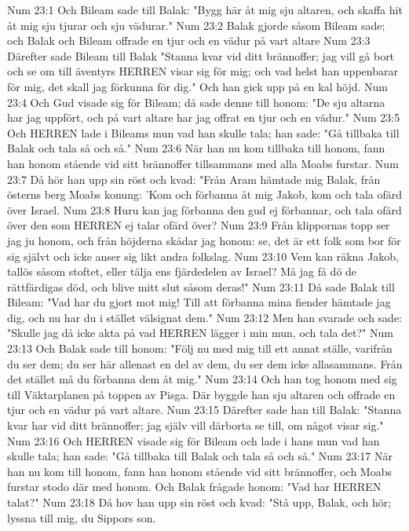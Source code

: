 Num 23:1  Och Bileam sade till Balak: "Bygg här åt mig sju altaren, och skaffa hit åt mig sju tjurar och sju vädurar."
Num 23:2  Balak gjorde såsom Bileam sade; och Balak och Bileam offrade en tjur och en vädur på vart altare
Num 23:3  Därefter sade Bileam till Balak "Stanna kvar vid ditt brännoffer; jag vill gå bort och se om till äventyrs HERREN visar sig för mig; och vad helst han uppenbarar för mig, det skall jag förkunna för dig." Och han gick upp på en kal höjd.
Num 23:4  Och Gud visade sig för Bileam; då sade denne till honom: "De sju altarna har jag uppfört, och på vart altare har jag offrat en tjur och en vädur."
Num 23:5  Och HERREN lade i Bileams mun vad han skulle tala; han sade: "Gå tillbaka till Balak och tala så och så."
Num 23:6  När han nu kom tillbaka till honom, fann han honom stående vid sitt brännoffer tillsammans med alla Moabs furstar.
Num 23:7  Då hör han upp sin röst och kvad: "Från Aram hämtade mig Balak, från österns berg Moabs konung: 'Kom och förbanna åt mig Jakob, kom och tala ofärd över Israel.
Num 23:8  Huru kan jag förbanna den gud ej förbannar, och tala ofärd över den som HERREN ej talar ofärd över?
Num 23:9  Från klippornas topp ser jag ju honom, och från höjderna skådar jag honom: se, det är ett folk som bor för sig självt och icke anser sig likt andra folkslag.
Num 23:10  Vem kan räkna Jakob, tallös såsom stoftet, eller tälja ens fjärdedelen av Israel? Må jag få dö de rättfärdigas död, och blive mitt slut såsom deras!"
Num 23:11  Då sade Balak till Bileam: "Vad har du gjort mot mig! Till att förbanna mina fiender hämtade jag dig, och nu har du i stället välsignat dem."
Num 23:12  Men han svarade och sade: "Skulle jag då icke akta på vad HERREN lägger i min mun, och tala det?"
Num 23:13  Och Balak sade till honom: "Följ nu med mig till ett annat ställe, varifrån du ser dem; du ser här allenast en del av dem, du ser dem icke allasammans. Från det stället må du förbanna dem åt mig."
Num 23:14  Och han tog honom med sig till Väktarplanen på toppen av Pisga. Där byggde han sju altaren och offrade en tjur och en vädur på vart altare.
Num 23:15  Därefter sade han till Balak: "Stanna kvar har vid ditt brännoffer; jag själv vill därborta se till, om något visar sig."
Num 23:16  Och HERREN visade sig för Bileam och lade i hans mun vad han skulle tala; han sade: "Gå tillbaka till Balak och tala så och så."
Num 23:17  När han nu kom till honom, fann han honom stående vid sitt brännoffer, och Moabs furstar stodo där med honom. Och Balak frågade honom: "Vad har HERREN talat?"
Num 23:18  Då hov han upp sin röst och kvad: "Stå upp, Balak, och hör; lyssna till mig, du Sippors son.
